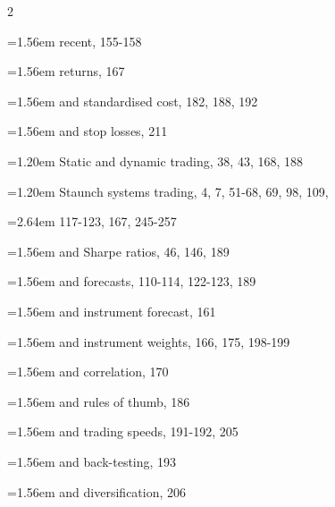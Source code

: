 {\begin{multicols}{2}
\par \noindent\hangindent=1.56em\hspace*{0.36em} recent, 155-158
\par \noindent\hangindent=1.56em\hspace*{0.36em} returns, 167
\par \noindent\hangindent=1.56em\hspace*{0.36em} and standardised cost, 182, 188, 192
\par \noindent\hangindent=1.56em\hspace*{0.36em} and stop losses, 211
\par \noindent\hangindent=1.20em\hspace*{0.00em} Static and dynamic trading, 38, 43, 168, 188
\par \noindent\hangindent=1.20em\hspace*{0.00em} Staunch systems trading, 4, 7, 51-68, 69, 98, 109,
\par \noindent\hangindent=2.64em\hspace*{1.44em} 117-123, 167, 245-257
\par \noindent\hangindent=1.56em\hspace*{0.36em} and Sharpe ratios, 46, 146, 189
\par \noindent\hangindent=1.56em\hspace*{0.36em} and forecasts, 110-114, 122-123, 189
\par \noindent\hangindent=1.56em\hspace*{0.36em} and instrument forecast, 161
\par \noindent\hangindent=1.56em\hspace*{0.36em} and instrument weights, 166, 175, 198-199
\par \noindent\hangindent=1.56em\hspace*{0.36em} and correlation, 170
\par \noindent\hangindent=1.56em\hspace*{0.36em} and rules of thumb, 186
\par \noindent\hangindent=1.56em\hspace*{0.36em} and trading speeds, 191-192, 205
\par \noindent\hangindent=1.56em\hspace*{0.36em} and back-testing, 193
\par \noindent\hangindent=1.56em\hspace*{0.36em} and diversification, 206

\end{multicols}}
